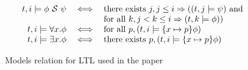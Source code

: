 \documentclass{llncs}
\newcommand{\aset}[1]{\{#1\}}
\newcommand{\tr}{t\xspace}
\newcommand{\tsince}{~\mathcal{S}~}
\newcommand{\mimplies}{\Rightarrow}
\begin{document}
\begin{figure}[!t]
\begin{displaymath}
\begin{array}{rcl}
      \tr, i  \models \phi \tsince \psi & \iff &
      \hbox{there exists } j, j \leq i \mimplies ((\tr, j  \models \psi)
      \hbox{ and } \\
      & & \hbox{for all } k, j < k \leq i \mimplies (\tr, k 
      \models \phi)) \\

      \tr, i  \models \forall x. \phi & \iff &
      \hbox{for all } p, (\tr, i  \models \aset{x\mapsto p} \phi) \\

      \tr, i  \models \exists x. \phi & \iff &
      \hbox{there exists } p, (\tr, i  \models \aset{x\mapsto p} \phi) \\
    \end{array}
  \end{displaymath}
  \caption{Models relation for LTL used in the paper}
  \label{fig:ltl}
\end{figure}
\end{document}
